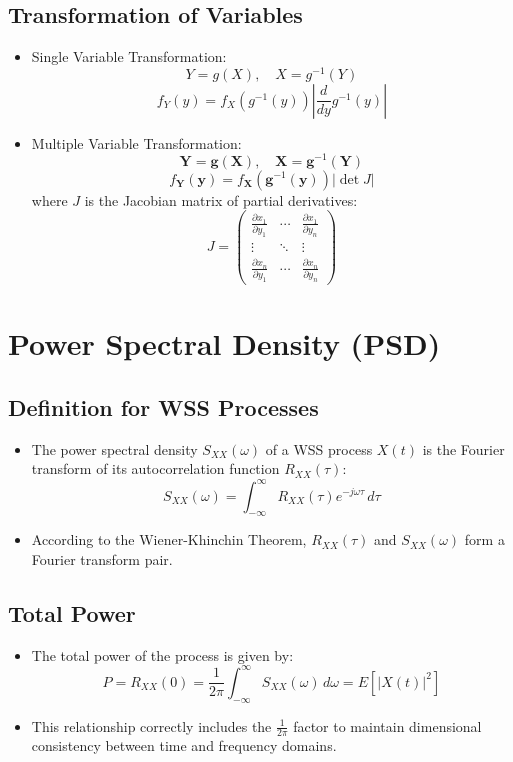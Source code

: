 \documentclass[12pt]{article}
\begin{document}
\subsection{Transformation of Variables}
\begin{itemize}
    \item Single Variable Transformation:
    \[
    Y = g(X), \quad X = g^{-1}(Y)
    \]
    \[
    f_Y(y) = f_X(g^{-1}(y)) \left| \frac{d}{dy} g^{-1}(y) \right|
    \]
    \item Multiple Variable Transformation:
    \[
    \mathbf{Y} = \mathbf{g}(\mathbf{X}), \quad \mathbf{X} = \mathbf{g}^{-1}(\mathbf{Y})
    \]
    \[
    f_{\mathbf{Y}}(\mathbf{y}) = f_{\mathbf{X}}(\mathbf{g}^{-1}(\mathbf{y})) \left| \det J \right|
    \]
    where \( J \) is the Jacobian matrix of partial derivatives:
    \[
    J = 
    \begin{pmatrix}
    \frac{\partial x_1}{\partial y_1} & \cdots & \frac{\partial x_1}{\partial y_n} \\
    \vdots & \ddots & \vdots \\
    \frac{\partial x_n}{\partial y_1} & \cdots & \frac{\partial x_n}{\partial y_n}
    \end{pmatrix}
    \]
\end{itemize}

\section{Power Spectral Density (PSD)}

\subsection{Definition for WSS Processes}
\begin{itemize}
    \item The power spectral density \( S_{XX}(\omega) \) of a WSS process \( X(t) \) is the Fourier transform of its autocorrelation function \( R_{XX}(\tau) \):
    \[
    S_{XX}(\omega) = \int_{-\infty}^{\infty} R_{XX}(\tau) e^{-j\omega \tau} \, d\tau
    \]
    \item According to the Wiener-Khinchin Theorem, \( R_{XX}(\tau) \) and \( S_{XX}(\omega) \) form a Fourier transform pair.
\end{itemize}

\subsection{Total Power}
\begin{itemize}
    \item The total power of the process is given by:
    \[
    P = R_{XX}(0) = \frac{1}{2\pi} \int_{-\infty}^{\infty} S_{XX}(\omega) \, d\omega = E[|X(t)|^2]
    \]
    \item This relationship correctly includes the \( \frac{1}{2\pi} \) factor to maintain dimensional consistency between time and frequency domains.
\end{itemize}
\end{document}
